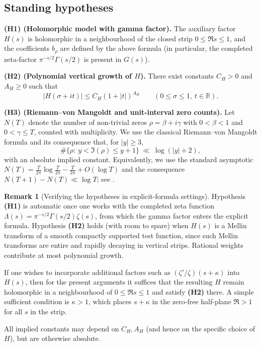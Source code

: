 \documentclass[11pt]{article}
\theoremstyle{plain}
\theoremstyle{definition}
\newtheorem{remark}[theorem]{Remark}
\begin{document}
\subsection*{Standing hypotheses}
\noindent\textbf{(H1) (Holomorphic model with gamma factor).}
The auxiliary factor $H(s)$ is holomorphic in a neighbourhood of the closed strip $0\le \Re s\le 1$, and the coefficients $b_\rho$ are defined by the above formula (in particular, the completed zeta-factor $\pi^{-s/2}\Gamma(s/2)$ is present in $G(s)$).

\medskip
\noindent\textbf{(H2) (Polynomial vertical growth of $H$).}
There exist constants $C_H>0$ and $A_H\ge 0$ such that
\[
  |H(\sigma+it)| \le C_H(1+|t|)^{A_H}
  \qquad (0\le \sigma\le 1,\ t\in\mathbb{R}).
\]

\medskip
\noindent\textbf{(H3) (Riemann--von Mangoldt and unit-interval zero counts).}
Let $N(T)$ denote the number of non-trivial zeros $\rho=\beta+i\gamma$ with $0<\beta<1$ and $0<\gamma\le T$, counted with multiplicity. We use the classical Riemann--von Mangoldt formula and its consequence that, for $|y|\ge 3$,
\[
  \#\{\rho:\ y<\Im(\rho)\le y+1\}\ \ll\ \log(|y|+2),
\]
with an absolute implied constant.
Equivalently, we use the standard asymptotic
$N(T)=\frac{T}{2\pi}\log\frac{T}{2\pi}-\frac{T}{2\pi}+O(\log T)$ and the
consequence $N(T+1)-N(T)\ll\log T$; see \cite[Ch.\ 9]{Titchmarsh}.

\begin{remark}[Verifying the hypotheses in explicit-formula settings]\label{rem:verify-hyp}
Hypothesis \textbf{(H1)} is automatic once one works with the completed zeta function
$\Lambda(s)=\pi^{-s/2}\Gamma(s/2)\zeta(s)$, from which the gamma factor enters the explicit formula.
Hypothesis \textbf{(H2)} holds (with room to spare) when $H(s)$ is a Mellin transform of a smooth compactly supported test function, since such Mellin transforms are entire and rapidly decaying in vertical strips. Rational weights contribute at most polynomial growth.

If one wishes to incorporate additional factors such as $(\zeta'/\zeta)(s+\kappa)$ into $H(s)$, then for the present arguments it suffices that the resulting $H$ remain holomorphic in a neighbourhood of $0\le \Re s\le 1$ and satisfy \textbf{(H2)} there. A simple sufficient condition is $\kappa>1$, which places $s+\kappa$ in the zero-free half-plane $\Re>1$ for all $s$ in the strip.
\end{remark}

\medskip
All implied constants may depend on $C_H,A_H$ (and hence on the specific choice of $H$), but are otherwise absolute.
\end{document}
